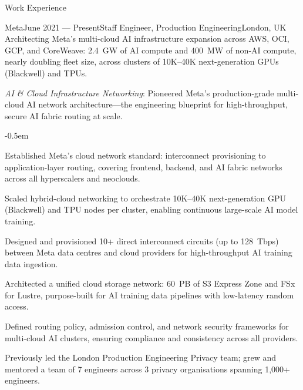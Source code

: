 \documentclass{resume}
\begin{document}

\begin{rSection}{Work Experience}

\begin{rSubsection}{Meta}{June 2021 --- Present}{Staff Engineer, Production Engineering}{London, UK}
{Architecting Meta's multi-cloud AI infrastructure expansion across AWS, OCI, GCP, and CoreWeave: 2.4~GW of AI compute and 400~MW of non-AI compute, nearly doubling fleet size, across clusters of 10K--40K next-generation GPUs (Blackwell) and TPUs.}

\item {\em AI \& Cloud Infrastructure Networking}:
Pioneered Meta's production-grade multi-cloud AI network architecture---the engineering blueprint
for high-throughput, secure AI fabric routing at scale.

\begin{itemize}
\renewcommand\labelitemi{--}
{\small
\itemsep -0.5em
\item Established Meta's cloud network standard: interconnect provisioning to application-layer routing, covering frontend, backend, and AI fabric networks across all hyperscalers and neoclouds.
\item Scaled hybrid-cloud networking to orchestrate 10K--40K next-generation GPU (Blackwell) and TPU nodes per cluster, enabling continuous large-scale AI model training.
\item Designed and provisioned 10+ direct interconnect circuits (up to 128~Tbps) between Meta data centres and cloud providers for high-throughput AI training data ingestion.
\item Architected a unified cloud storage network: 60~PB of S3 Express Zone and FSx for Lustre, purpose-built for AI training data pipelines with low-latency random access.
\item Defined routing policy, admission control, and network security frameworks for multi-cloud AI clusters, ensuring compliance and consistency across all providers.

}
\end{itemize}
\end{rSubsection} 

\pagebreak

\begin{rSubsection}{}{}{}{}{Previously led the London Production Engineering Privacy team; grew and mentored a team of 7 engineers across 3 privacy organisations spanning 1,000+ engineers.}


\end{rSubsection}
\end{rSection}
\end{document}
